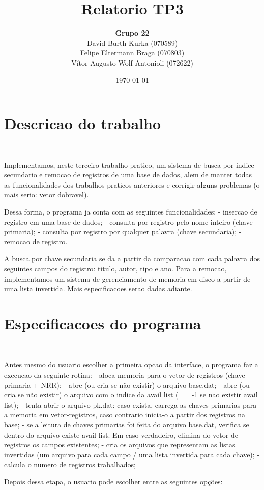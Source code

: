 \documentclass{article}
\title{\textbf{Relatorio TP3}}
\author{\textbf{Grupo 22} \\
  David Burth Kurka (070589) \\
  Felipe Eltermann Braga (070803) \\
  Vítor Augusto Wolf Antonioli (072622)}
\date{\today}
\begin{document}
\maketitle

\section{Descricao do trabalho}\

Implementamos, neste terceiro trabalho pratico, um sistema de busca por indice secundario e remocao de registros de uma base de dados, alem de manter todas as funcionalidades dos trabalhos praticos anteriores e corrigir alguns problemas (o mais serio: vetor dobravel).

Dessa forma, o programa ja conta com as seguintes funcionalidades: 
- insercao de registro em uma base de dados; 
- consulta por registro pelo nome inteiro (chave primaria); 
- consulta por registro por qualquer palavra (chave secundaria); 
- remocao de registro.

A busca por chave secundaria se da a partir da comparacao com cada palavra dos seguintes 
campos do registro: titulo, autor, tipo e ano. Para a remocao, implementamos um sistema 
de gerenciamento de memoria em disco a partir de uma lista invertida. Mais especificacoes serao dadas adiante.

\section{Especificacoes do programa}\

Antes mesmo do usuario escolher a primeira opcao da interface, o programa faz a execucao da seguinte rotina: 
- aloca memoria para o vetor de registros (chave primaria + NRR); 
- abre (ou cria se não existir) o arquivo base.dat;
- abre (ou cria se não existir) o arquivo com o indice da avail list (== -1 se nao existir avail list);
- tenta abrir o arquivo pk.dat: caso exista, carrega as chaves primarias para a memoria em vetor-registros, caso contrario inicia-o a partir dos registros na base;
- se a leitura de chaves primarias foi feita do arquivo base.dat, verifica se dentro do arquivo existe avail list. Em caso verdadeiro, elimina do vetor de registros os campos existentes;
- cria os arquivos que representam as listas invertidas (um arquivo para cada campo / uma lista invertida para cada chave);
- calcula o numero de registros trabalhados;


Depois dessa etapa, o usuario pode escolher entre as seguintes opções:
\end{document}
